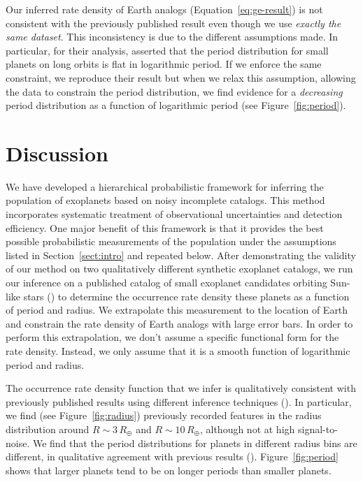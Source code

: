 \documentclass[12pt,preprint]{aastex}
\newcommand{\figref}[1]{\ref{fig:#1}}
\newcommand{\Fig}[1]{Figure~\figref{#1}}
\newcommand{\fig}[1]{\Fig{#1}}
\newcommand{\eqalt}[1]{Equation~\ref{eq:#1}}
\newcommand{\Sect}[1]{Section~\ref{sect:#1}}
\newcommand{\sect}[1]{\Sect{#1}}
\newcommand{\radius}{\ensuremath{R}}
\begin{document}
Our inferred rate density of Earth analogs (\eqalt{ge-result}) is not
consistent with the previously published result even though we use
\emph{exactly the same dataset}.
This inconsistency is due to the different assumptions made.
In particular, for their analysis, \citet{petigura} asserted that the period
distribution for small planets on long orbits is flat in logarithmic period.
If we enforce the same constraint, we reproduce their result but when we relax
this assumption, allowing the data to constrain the period distribution, we
find evidence for a \emph{decreasing} period distribution as a function of
logarithmic period (see \fig{period}).

\section{Discussion}

We have developed a hierarchical probabilistic framework for inferring the
population of exoplanets based on noisy incomplete catalogs.
This method incorporates systematic treatment of observational uncertainties
and detection efficiency.
One major benefit of this framework is that it provides the best possible
probabilistic measurements of the population under the assumptions listed in
\sect{intro} and repeated below.
After demonstrating the validity of our method on two qualitatively different
synthetic exoplanet catalogs, we run our inference on a published catalog of
small exoplanet candidates orbiting Sun-like stars (\citealt{petigura}) to
determine the occurrence rate density these planets as a function of period
and radius.
We extrapolate this measurement to the location of Earth and constrain the
rate density of Earth analogs with large error bars.
In order to perform this extrapolation, we don't assume a specific functional
form for the rate density.
Instead, we only assume that it is a smooth function of logarithmic period and
radius.

The occurrence rate density function that we infer is qualitatively consistent
with previously published results using different inference techniques
(\citealt{dong, fressin-fp, petigura}).
In particular, we find (see \fig{radius}) previously recorded features in the
radius distribution around $\radius\sim 3\,\radius_\oplus$ and $\radius\sim
10\,\radius_\oplus$, although not at high signal-to-noise.
We find that the period distributions for planets in different radius bins are
different, in qualitative agreement with previous results (\citealt{dong}).
\Fig{period} shows that larger planets tend to be on longer periods than
smaller planets.
\end{document}
